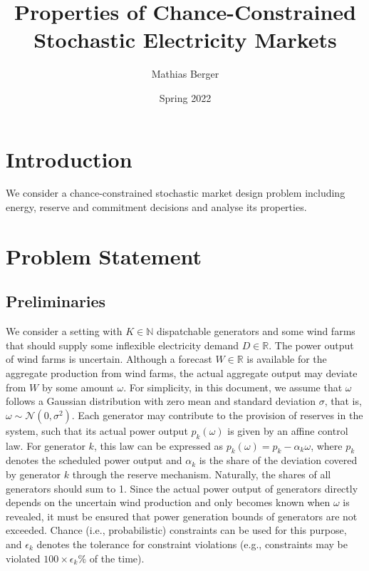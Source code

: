 \documentclass{article}
\title{Properties of Chance-Constrained Stochastic Electricity Markets}
\author{Mathias Berger}
\date{Spring 2022}
\begin{document}
\maketitle

\section{Introduction}

We consider a chance-constrained stochastic market design problem \cite{Kuang2018,Dvorkin2020} including energy, reserve and commitment decisions and analyse its properties. 

\section{Problem Statement}

\subsection{Preliminaries}

We consider a setting with $K \in \mathbb{N}$ dispatchable generators and some wind farms that should supply some inflexible electricity demand $D \in \mathbb{R}$. The power output of wind farms is uncertain. Although a forecast $W \in \mathbb{R}$ is available for the aggregate production from wind farms, the actual aggregate output may deviate from $W$ by some amount $\omega$. For simplicity, in this document, we assume that $\omega$ follows a Gaussian distribution with zero mean and standard deviation $\sigma$, that is, $\omega \sim \mathcal{N}(0, \sigma^2)$. Each generator may contribute to the provision of reserves in the system, such that its actual power output $p_k(\omega)$ is given by an affine  control law. For generator $k$, this law can be expressed as $p_k(\omega) = p_k - \alpha_k \omega$, where $p_k$ denotes the scheduled power output and $\alpha_k$ is the share of the deviation covered by generator $k$ through the reserve mechanism. Naturally, the shares of all generators should sum to 1. Since the actual power output of generators directly depends on the uncertain wind production and only becomes known when $\omega$ is revealed, it must be ensured that power generation bounds of generators are not exceeded. Chance (i.e., probabilistic) constraints can be used for this purpose, and $\epsilon_k$ denotes the tolerance for constraint violations (e.g., constraints may be violated $100 \times \epsilon_k \%$ of the time).
\end{document}
